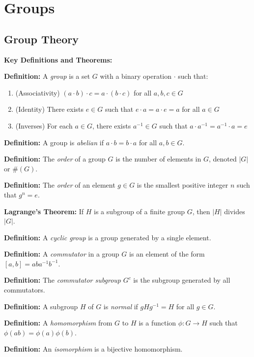 \chapter{Groups}

\section{Group Theory}

\textbf{Key Definitions and Theorems:}

\textbf{Definition:} A \textit{group} is a set $G$ with a binary operation $\cdot$ such that:
\begin{enumerate}
\item (Associativity) $(a \cdot b) \cdot c = a \cdot (b \cdot c)$ for all $a, b, c \in G$
\item (Identity) There exists $e \in G$ such that $e \cdot a = a \cdot e = a$ for all $a \in G$
\item (Inverses) For each $a \in G$, there exists $a^{-1} \in G$ such that $a \cdot a^{-1} = a^{-1} \cdot a = e$
\end{enumerate}

\textbf{Definition:} A group is \textit{abelian} if $a \cdot b = b \cdot a$ for all $a, b \in G$.

\textbf{Definition:} The \textit{order} of a group $G$ is the number of elements in $G$, denoted $|G|$ or $\#(G)$.

\textbf{Definition:} The \textit{order} of an element $g \in G$ is the smallest positive integer $n$ such that $g^n = e$.

\textbf{Lagrange's Theorem:} If $H$ is a subgroup of a finite group $G$, then $|H|$ divides $|G|$.

\textbf{Definition:} A \textit{cyclic group} is a group generated by a single element.

\textbf{Definition:} A \textit{commutator} in a group $G$ is an element of the form $[a,b] = aba^{-1}b^{-1}$.

\textbf{Definition:} The \textit{commutator subgroup} $G^c$ is the subgroup generated by all commutators.

\textbf{Definition:} A subgroup $H$ of $G$ is \textit{normal} if $gHg^{-1} = H$ for all $g \in G$.

\textbf{Definition:} A \textit{homomorphism} from $G$ to $H$ is a function $\phi: G \to H$ such that $\phi(ab) = \phi(a)\phi(b)$.

\textbf{Definition:} An \textit{isomorphism} is a bijective homomorphism.

